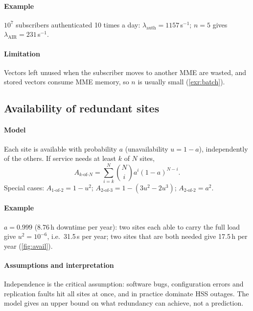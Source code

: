 \documentclass[11pt,a4paper]{article}
\begin{document}
\paragraph{Example} $10^7$ subscribers authenticated 10 times a day: $\lambda_{\mathrm{auth}} = 1157$\,s$^{-1}$;
$n = 5$ gives $\lambda_{\mathrm{AIR}} = 231$\,s$^{-1}$. \paragraph{Limitation} Vectors left unused when the
subscriber moves to another MME are wasted, and stored vectors consume MME memory, so $n$ is usually
small (\cref{exr:batch}).

\subsection{Availability of redundant sites}\label{sec:avail}
\paragraph{Model} Each site is available with probability $a$ (unavailability $u = 1-a$), independently
of the others. If service needs at least $k$ of $N$ sites,
\begin{equation}\label{eq:avail}
  A_{k\text{-of-}N} = \sum_{i=k}^{N}\binom{N}{i}a^{i}(1-a)^{N-i}.
\end{equation}
Special cases: $A_{1\text{-of-}2} = 1-u^2$; $A_{2\text{-of-}3} = 1-(3u^2-2u^3)$; $A_{2\text{-of-}2} = a^2$.
\paragraph{Example} $a = 0.999$ (8.76\,h downtime per year): two sites each able to carry the full load
give $u^2 = 10^{-6}$, i.e.\ 31.5\,s per year; two sites that are both needed give 17.5\,h per year
(\cref{fig:avail}).
\paragraph{Assumptions and interpretation} Independence is the critical assumption: software bugs,
configuration errors and replication faults hit all sites at once, and in practice dominate HSS outages.
The model gives an upper bound on what redundancy can achieve, not a prediction.

\begin{acnfigure}
  \caption{Annual downtime as a function of single-site unavailability for four deployment options
           (independent failures assumed).}
  \label{fig:avail}
\end{acnfigure}
\end{document}
